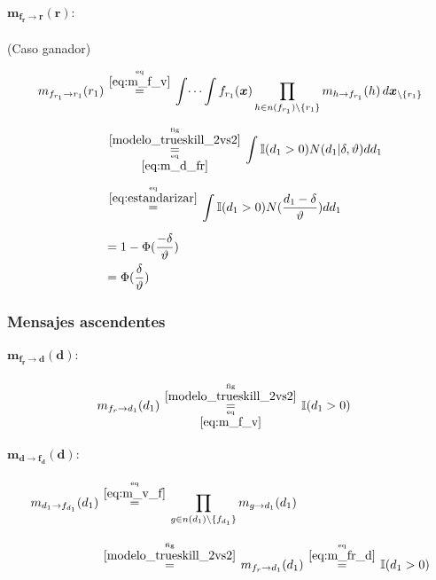 \documentclass[article]{jss}
\newcommand\hfrac[2]{\genfrac{}{}{0pt}{}{#1}{#2}} %
\begin{document}
\paragraph{$\bm{m_{f_r \rightarrow r}(r)}:$} (Caso ganador)

\begin{equation}\label{eq:m_fr_r}
\begin{split}
 m_{f_{r_1} \rightarrow r_1}(r_1) & \overset{\hfrac{\text{eq}}{\ref{eq:m_f_v}}}{=} \int \dots \int f_{r_1}(\bm{x}) \prod_{h \in n(f_{r_1}) \setminus \{r_1\} } m_{h \rightarrow f_{r_1}}(h) \, d\bm{x}_{\setminus \{r_1\} }  \\[0.2cm]
 & \overset{\hfrac{\text{fig}}{\ref{modelo_trueskill_2vs2}}}{\underset{\hfrac{\text{eq}}{\ref{eq:m_d_fr}}}{=}} \int \mathbb{I}(d_1 > 0) N(d_1 | \delta, \vartheta)  dd_1 \\[0.2cm]
 &  \overset{\hfrac{\text{eq}}{\ref{eq:estandarizar}}}{=} \int \mathbb{I}(d_1 > 0) N( \frac{d_1 - \delta}{\vartheta}) dd_1 \\[0.2cm]
 & = 1 - \Phi(\frac{-\delta}{\vartheta}) \\
 & = \Phi(\frac{\delta}{\vartheta})
\end{split}
\end{equation}













\subsubsection{Mensajes ascendentes}

\paragraph{$\bm{m_{f_r \rightarrow d}(d)}:$}

\begin{equation}\label{eq:m_fr_d}
\begin{split}
m_{f_r \rightarrow d_1}(d_1) & \overset{\hfrac{\text{fig}}{\ref{modelo_trueskill_2vs2}}}{\underset{\hfrac{\text{eq}}{\ref{eq:m_f_v}}}{=}} \mathbb{I}(d_1 > 0)
\end{split}
\end{equation}


\paragraph{$\bm{m_{d \rightarrow f_d}(d)}:$}
\begin{equation}\label{eq:m_d_fd}
\begin{split}
m_{d_1 \rightarrow f_{d_1}}(d_1) & \overset{\hfrac{\text{eq}}{\ref{eq:m_v_f}}}{=} \prod_{g \in n(d_1) \setminus  \{f_{d_1} \}} m_{g \rightarrow d_1} (d_1) \\[0.3cm]
 & \overset{\hfrac{\text{fig}}{\ref{modelo_trueskill_2vs2}}}{=} m_{f_r \rightarrow d_1}(d_1) \overset{\hfrac{\text{eq}}{\ref{eq:m_fr_d}}}{=} \mathbb{I}(d_1 > 0)
\end{split}
\end{equation}
\end{document}
